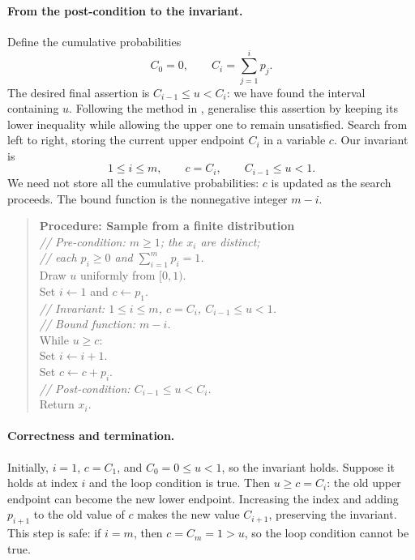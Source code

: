 \paragraph{From the post-condition to the invariant.}
Define the cumulative probabilities
\[
 C_0=0,\qquad C_i=\sum_{j=1}^{i}p_j.
\]
The desired final assertion is $C_{i-1}\leq u<C_i$: we have found the
interval containing $u$. Following the method in
, generalise this assertion
by keeping its lower inequality while allowing the upper one to remain
unsatisfied. Search from left to right, storing the current upper endpoint
$C_i$ in a variable $c$. Our invariant is
\[
 1\leq i\leq m,\qquad c=C_i,\qquad C_{i-1}\leq u<1.
\]
We need not store all the cumulative probabilities: $c$ is updated as the
search proceeds. The bound function is the nonnegative integer $m-i$.

\begin{quote}
\begin{minipage}{\linewidth}
\textbf{Procedure: Sample from a finite distribution}\\[4pt]
\textit{// Pre-condition: $m\geq1$; the $x_i$ are distinct;}\\
\textit{// each $p_i\geq0$ and $\sum_{i=1}^{m}p_i=1$.}\\[3pt]
Draw $u$ uniformly from $[0,1)$.\\
Set $i\leftarrow1$ and $c\leftarrow p_1$.\\[3pt]
\textit{// Invariant: $1\leq i\leq m$, $c=C_i$, $C_{i-1}\leq u<1$.}\\
\textit{// Bound function: $m-i$.}\\[3pt]
While $u\geq c$:\\
\hspace*{1em}Set $i\leftarrow i+1$.\\
\hspace*{1em}Set $c\leftarrow c+p_i$.\\[3pt]
\textit{// Post-condition: $C_{i-1}\leq u<C_i$.}\\
Return $x_i$.
\end{minipage}
\end{quote}

\paragraph{Correctness and termination.}
Initially, $i=1$, $c=C_1$, and $C_0=0\leq u<1$, so the invariant holds.
Suppose it holds at index $i$ and the loop condition is true. Then
$u\geq c=C_i$: the old upper endpoint can become the new lower endpoint.
Increasing the index and adding $p_{i+1}$ to the old value of $c$ makes
the new value $C_{i+1}$, preserving the invariant. This step is safe:
if $i=m$, then $c=C_m=1>u$, so the loop condition cannot be true.

